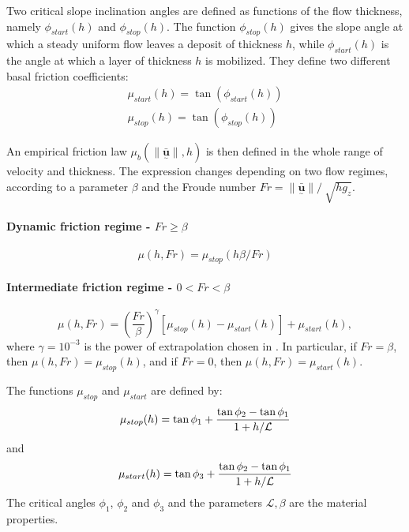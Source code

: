 \documentclass{article}
\begin{document}
Two critical slope inclination angles are defined as functions of the flow thickness, namely $\phi_{start}(h)$ and $\phi_{stop}(h)$. The function $\phi_{stop}(h)$ gives the slope angle at which a steady uniform flow leaves a deposit of thickness $h$, while $\phi_{start}(h)$ is the angle at which a layer of thickness $h$ is mobilized. They define two different basal friction coefficients:
\begin{eqnarray}
\mu_{start}(h)=\tan(\phi_{start}(h))\\
\mu_{stop}(h)=\tan(\phi_{stop}(h))
\end{eqnarray}

An empirical friction law $\mu_{b}(\|\underset{^\sim}{\bar{\textbf{u}}} \| , h)$ is then defined in the whole range of velocity and thickness. The expression changes depending on two flow regimes, according to a parameter $\beta$ and the Froude number $Fr=\| \underset{^\sim}{\bar{\textbf{u}}} \| / \ \sqrt{h g_{z}}$.

\paragraph{Dynamic friction regime - $Fr \geq \beta$}
\begin{equation}\label{mu_beta1}
\mu(h, Fr)=\mu_{stop}(h \beta / Fr)
\end{equation}

\paragraph{Intermediate friction regime - $0 < Fr < \beta$}
\begin{equation}\label{mu_beta2}
\mu(h, Fr)=\left(\frac{Fr}{\beta}\right)^\gamma [\mu_{stop}(h)-\mu_{start}(h)] + \mu_{start}(h),
\end{equation}
where $\gamma=10^{-3}$ is the power of extrapolation chosen in \cite{PouliquenForterre2002}. In particular, if $Fr=\beta$, then $\mu(h, Fr)=\mu_{stop}(h)$, and if $Fr = 0$, then $\mu(h, Fr)=\mu_{start}(h)$.

The functions $\mu_{stop}$ and $\mu_{start}$ are defined by:
\begin{equation}\label{mu-stop}
\mu_{stop}(h)=\tan\phi_{1} + \frac{\tan\phi_{2}-\tan\phi_{1}}{1+h/\it \mathcal{L}}
\end{equation}
and
\begin{equation}\label{mu-start}
\mu_{start}(h)=\tan\phi_{3} + \frac{\tan\phi_{2}-\tan\phi_{1}}{1+h/\it \mathcal{L}}
\end{equation}
The critical angles $\phi_{1}$, $\phi_{2}$ and $\phi_{3}$ and the parameters $\mathcal{L}, \beta$ are the material properties.
\end{document}
